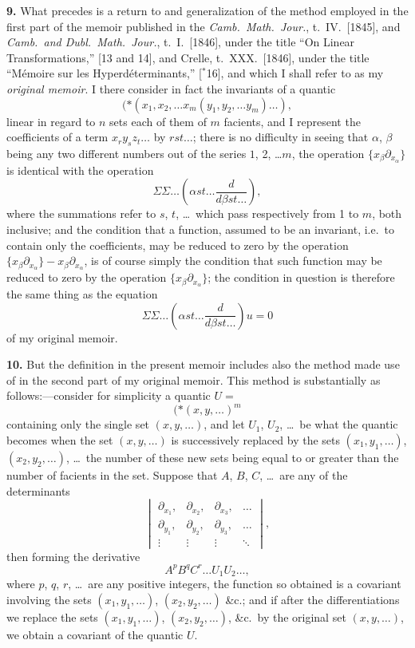 \documentclass[12pt,a4paper]{article}
\begin{document}
\textbf{9.} What precedes is a return to and generalization of the method employed in the first part of the memoir published in the \textit{Camb.\ Math.\ Jour.}, t.\ IV.\ [1845], and \textit{Camb.\ and Dubl.\ Math.\ Jour.}, t.\ I.\ [1846], under the title ``On Linear Transformations,'' [13 and 14], and Crelle, t.\ XXX.\ [1846], under the title ``M\'{e}moire sur les Hyperd\'{e}terminants,'' [$^{*}$16], and which I shall refer to as my \textit{original memoir}. I there consider in fact the invariants of a quantic
\[
(*\!\!\!\!\!(x_1, x_2, \ldots x_m \!\!\!\!(y_1, y_2, \ldots y_m) \ldots),
\]
linear in regard to $n$ sets each of them of $m$ facients, and I represent the coefficients of a term $x_r y_s z_t \ldots$ by $rst \ldots$; there is no difficulty in seeing that $\alpha$, $\beta$ being any two different numbers out of the series $1$, 2, \ldots $m$, the operation $\{x_{\beta} \partial_{x_{\alpha}}\}$ is identical with the operation
\[
\Sigma\Sigma \ldots \left(\alpha st \ldots \frac{d}{d\beta st \ldots}\right),
\]
where the summations refer to $s$, $t$, \ldots\ which pass respectively from 1 to $m$, both inclusive; and the condition that a function, assumed to be an invariant, i.e.\ to contain only the coefficients, may be reduced to zero by the operation $\{x_{\beta} \partial_{x_{\alpha}}\} - x_{\beta} \partial_{x_{\alpha}}$, is of course simply the condition that such function may be reduced to zero by the operation $\{x_{\beta} \partial_{x_{\alpha}}\}$; the condition in question is therefore the same thing as the equation
\[
\Sigma\Sigma \ldots \left(\alpha st \ldots \frac{d}{d\beta st \ldots}\right) u = 0
\]
of my original memoir.

\newpage
\setcounter{page}{226}

\textbf{10.} But the definition in the present memoir includes also the method made use of in the second part of my original memoir. This method is substantially as follows:---consider for simplicity a quantic $U =$
\[
(*\!\!\!\!\!(x, y, \ldots)^m
\]
containing only the single set $(x, y, \ldots)$, and let $U_1$, $U_2$, \ldots\ be what the quantic becomes when the set $(x, y, \ldots)$ is successively replaced by the sets $(x_1, y_1, \ldots)$, $(x_2, y_2, \ldots)$, \ldots\ the number of these new sets being equal to or greater than the number of facients in the set. Suppose that $A$, $B$, $C$, \ldots\ are any of the determinants
\[
\begin{vmatrix}
\partial_{x_1}, & \partial_{x_2}, & \partial_{x_3}, & \ldots \\
\partial_{y_1}, & \partial_{y_2}, & \partial_{y_3}, & \ldots \\
\vdots & \vdots & \vdots & \ddots
\end{vmatrix},
\]
then forming the derivative
\[
A^p B^q C^r \ldots U_1 U_2 \ldots,
\]
where $p$, $q$, $r$, \ldots\ are any positive integers, the function so obtained is a covariant involving the sets $(x_1, y_1, \ldots)$, $(x_2, y_2, \ldots)$ \&c.; and if after the differentiations we replace the sets $(x_1, y_1, \ldots)$, $(x_2, y_2, \ldots)$, \&c.\ by the original set $(x, y, \ldots)$, we obtain a covariant of the quantic $U$.
\end{document}
